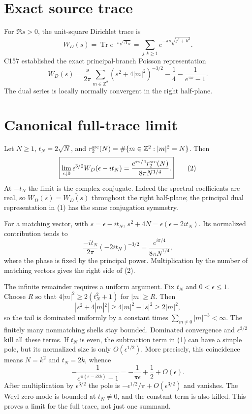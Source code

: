 \documentclass[10pt]{article}
\begin{document}
\section{Exact source trace}
For $\Re s>0$, the unit-square Dirichlet trace is
\[
W_D(s)=\operatorname{Tr}e^{-s\sqrt{\Delta_D}}
=\sum_{j,k\ge1}e^{-\pi s\sqrt{j^2+k^2}}.
\]
C157 established the exact principal-branch Poisson representation
\[
W_D(s)=\frac{s}{2\pi}\sum_{m\in\mathbb Z^2}
(s^2+4|m|^2)^{-3/2}-\frac14-\frac1{e^{\pi s}-1}.              \tag{1}
\]
The dual series is locally normally convergent in the right half-plane.

\section{Canonical full-trace limit}
Let $N\ge1$, $t_N=2\sqrt N$, and
$r_2^{\rm src}(N)=\#\{m\in\mathbb Z^2:|m|^2=N\}$.  Then
\[
\boxed{\lim_{\epsilon\downarrow0}\epsilon^{3/2}
W_D(\epsilon-it_N)=
\frac{e^{i\pi/4}r_2^{\rm src}(N)}{8\pi N^{1/4}}.}            \tag{2}
\]
At $-t_N$ the limit is the complex conjugate.  Indeed the spectral
coefficients are real, so
$W_D(\overline{s})=\overline{W_D(s)}$ throughout the right half-plane; the
principal dual representation in (1) has the same conjugation symmetry.

For a matching vector, with $s=\epsilon-it_N$,
$s^2+4N=\epsilon(\epsilon-2it_N)$.  Its normalized contribution tends to
\[
\frac{-it_N}{2\pi}(-2it_N)^{-3/2}
=\frac{e^{i\pi/4}}{8\pi N^{1/4}},                            \tag{3}
\]
where the phase is fixed by the principal power.  Multiplication by the number
of matching vectors gives the right side of (2).

The infinite remainder requires a uniform argument.  Fix $t_N$ and
$0<\epsilon\le1$.  Choose $R$ so that
$4|m|^2\ge2(t_N^2+1)$ for $|m|\ge R$.  Then
\[
|s^2+4|m|^2|\ge4|m|^2-|s|^2\ge2|m|^2,
\]
so the tail is dominated uniformly by a constant times
$\sum_{m\ne0}|m|^{-3}<\infty$.  The finitely many nonmatching shells stay
bounded.  Dominated convergence and $\epsilon^{3/2}$ kill all these terms.
If $t_N$ is even, the subtraction term in (1) can have a simple pole, but its
normalized size is only $O(\epsilon^{1/2})$.  More precisely, this coincidence
means $N=k^2$ and $t_N=2k$, whence
\[
-\frac1{e^{\pi(\epsilon-i2k)}-1}
=-\frac1{\pi\epsilon}+\frac12+O(\epsilon).
\]
After multiplication by $\epsilon^{3/2}$ the pole is
$-\epsilon^{1/2}/\pi+O(\epsilon^{3/2})$ and vanishes.  The Weyl zero-mode is
bounded at $t_N\ne0$, and the constant term is also killed.  This proves a
limit for the full trace, not just one summand.
\end{document}
